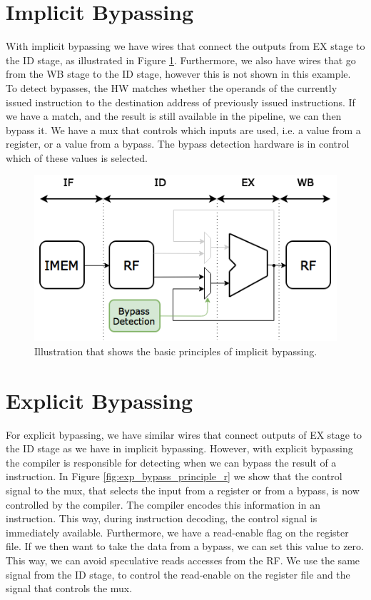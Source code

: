 \section{Implicit Bypassing}
With implicit bypassing we have wires that connect the outputs from EX stage to the ID stage, as illustrated in Figure \ref{fig:impl_bypass_principle}. Furthermore, we also have wires that go from the WB stage to the ID stage, however this is not shown in this example. To detect bypasses, the HW matches whether the operands of the currently issued instruction to the destination address of previously issued instructions. If we have a match, and the result is still available in the pipeline, we can then bypass it. We have a mux that controls which inputs are used, i.e. a value from a register, or a value from a bypass. The bypass detection hardware is in control which of these values is selected.

\begin{figure}[t]
\centering
\includegraphics[width=.5\textwidth]{figures/impl_bypassing_principle/03_implicit_bypassing_principle}
\caption{Illustration that shows the basic principles of implicit bypassing.}
\label{fig:impl_bypass_principle}
\end{figure}

\section{Explicit Bypassing}
For explicit bypassing, we have similar wires that connect outputs of EX stage to the ID stage as we have in implicit bypassing. However, with explicit bypassing the compiler is responsible for detecting when we can bypass the result of a instruction. In Figure \ref{fig:exp_bypass_principle_r} we show that the control signal to the mux, that selects the input from a register or from a bypass, is now controlled by the compiler. The compiler encodes this information in an instruction. This way, during instruction decoding, the control signal is immediately available. Furthermore, we have a read-enable flag on the register file. If we then want to take the data from a bypass, we can set this value to zero. This way, we can avoid speculative reads accesses from the RF. We use the same signal from the ID stage, to control the read-enable on the register file and the signal that controls the mux. 

